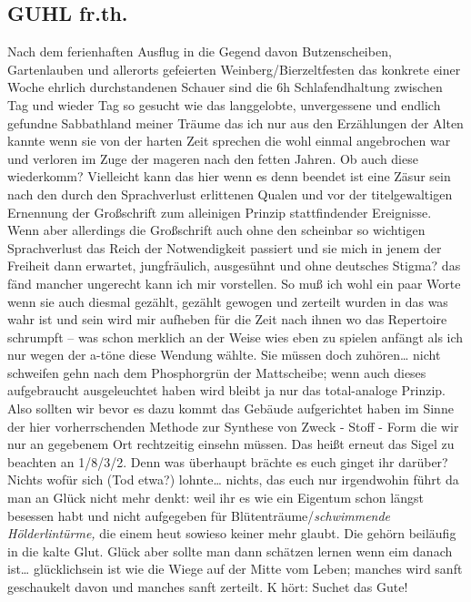 \documentclass[
]{article}
\author{}
\date{\vspace{-2.5em}}
\begin{document}
\subsection{GUHL fr.th.}\label{guhl-fr.th.}

Nach dem ferienhaften Ausflug in die Gegend davon Butzenscheiben,
Gartenlauben und allerorts gefeierten Weinberg/Bierzeltfesten das
konkrete einer Woche ehrlich durchstandenen Schauer sind die 6h
Schlafendhaltung zwischen Tag und wieder Tag so gesucht wie das
langgelobte, unvergessene und endlich gefundne Sabbathland meiner Träume
das ich nur aus den Erzählungen der Alten kannte wenn sie von der harten
Zeit sprechen die wohl einmal angebrochen war und verloren im Zuge der
mageren nach den fetten Jahren. Ob auch diese wiederkomm? Vielleicht
kann das hier wenn es denn beendet ist eine Zäsur sein nach den durch
den Sprachverlust erlittenen Qualen und vor der titelgewaltigen
Ernennung der Großschrift zum alleinigen Prinzip stattfindender
Ereignisse. Wenn aber allerdings die Großschrift auch ohne den scheinbar
so wichtigen Sprachverlust das Reich der Notwendigkeit passiert und sie
mich in jenem der Freiheit dann erwartet, jungfräulich, ausgesühnt und
ohne deutsches Stigma? das fänd mancher ungerecht kann ich mir
vorstellen. So muß ich wohl ein paar Worte wenn sie auch diesmal
gezählt, gezählt gewogen und zerteilt wurden in das was wahr ist und
sein wird mir aufheben für die Zeit nach ihnen wo das Repertoire
schrumpft -- was schon merklich an der Weise wies eben zu spielen
anfängt als ich nur wegen der a-töne diese Wendung wählte. Sie müssen
doch zuhören\ldots{} nicht schweifen gehn nach dem Phosphorgrün der
Mattscheibe; wenn auch dieses aufgebraucht ausgeleuchtet haben wird
bleibt ja nur das total-analoge Prinzip. Also sollten wir bevor es dazu
kommt das Gebäude aufgerichtet haben im Sinne der hier vorherrschenden
Methode zur Synthese von Zweck - Stoff - Form die wir nur an gegebenem
Ort rechtzeitig einsehn müssen. Das heißt erneut das Sigel zu beachten
an 1/8/3/2. Denn was überhaupt brächte es euch ginget ihr darüber?
Nichts wofür sich (Tod etwa?) lohnte\ldots{} nichts, das euch nur
irgendwohin führt da man an Glück nicht mehr denkt: weil ihr es wie ein
Eigentum schon längst besessen habt und nicht aufgegeben für
Blütenträume/\emph{schwimmende Hölderlintürme,} die einem heut sowieso
keiner mehr glaubt. Die gehörn beiläufig in die kalte Glut. Glück aber
sollte man dann schätzen lernen wenn eim danach ist\ldots{}
glücklichsein ist wie die Wiege auf der Mitte vom Leben; manches wird
sanft geschaukelt davon und manches sanft zerteilt. K hört: Suchet das
Gute!
\end{document}
